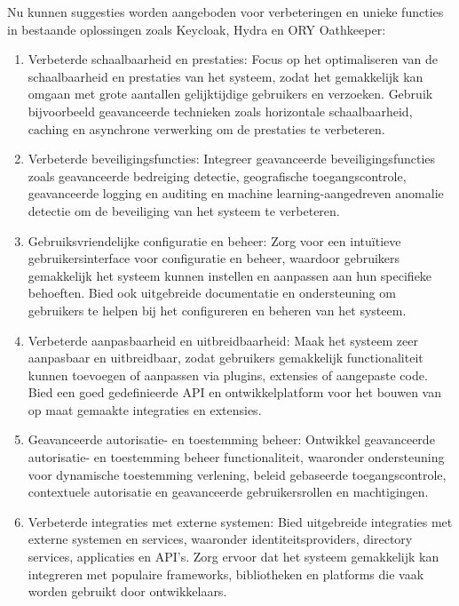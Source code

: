 Nu kunnen suggesties worden aangeboden voor verbeteringen en unieke functies in bestaande oplossingen zoals Keycloak, Hydra en ORY Oathkeeper:

\begin{enumerate}
  \item Verbeterde schaalbaarheid en prestaties: Focus op het optimaliseren van de schaalbaarheid en prestaties van het systeem, zodat het gemakkelijk kan omgaan met grote aantallen gelijktijdige gebruikers en verzoeken. Gebruik bijvoorbeeld geavanceerde technieken zoals horizontale schaalbaarheid, caching en asynchrone verwerking om de prestaties te verbeteren.
  
  \item Verbeterde beveiligingsfuncties: Integreer geavanceerde beveiligingsfuncties zoals geavanceerde bedreiging detectie, geografische toegangscontrole, geavanceerde logging en auditing en machine learning-aangedreven anomalie detectie om de beveiliging van het systeem te verbeteren.
  
  \item Gebruiksvriendelijke configuratie en beheer: Zorg voor een intuïtieve gebruikersinterface voor configuratie en beheer, waardoor gebruikers gemakkelijk het systeem kunnen instellen en aanpassen aan hun specifieke behoeften. Bied ook uitgebreide documentatie en ondersteuning om gebruikers te helpen bij het configureren en beheren van het systeem.
  
  \item Verbeterde aanpasbaarheid en uitbreidbaarheid: Maak het systeem zeer aanpasbaar en uitbreidbaar, zodat gebruikers gemakkelijk functionaliteit kunnen toevoegen of aanpassen via plugins, extensies of aangepaste code. Bied een goed gedefinieerde API en ontwikkelplatform voor het bouwen van op maat gemaakte integraties en extensies.
  
  \item Geavanceerde autorisatie- en toestemming beheer: Ontwikkel geavanceerde autorisatie- en toestemming beheer functionaliteit, waaronder ondersteuning voor dynamische toestemming verlening, beleid gebaseerde toegangscontrole, contextuele autorisatie en geavanceerde gebruikersrollen en machtigingen.
  
  \item Verbeterde integraties met externe systemen: Bied uitgebreide integraties met externe systemen en services, waaronder identiteitsproviders, directory services, applicaties en API's. Zorg ervoor dat het systeem gemakkelijk kan integreren met populaire frameworks, bibliotheken en platforms die vaak worden gebruikt door ontwikkelaars.
\end{enumerate}

